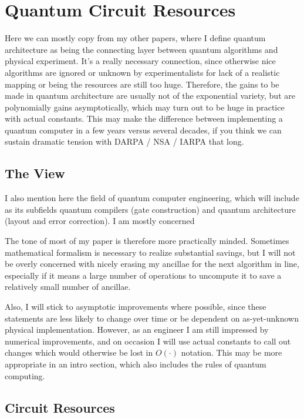 \section{Quantum Circuit Resources}

Here we can mostly copy from my other papers, where I define quantum
architecture as being the connecting layer between quantum algorithms
and physical experiment. It's a really necessary connection, since otherwise
nice algorithms are ignored or unknown by experimentalists for lack of a
realistic mapping or being the resources are still too huge. Therefore, the
gains to be made in quantum architecture are usually not of the exponential
variety, but are polynomially gains asymptotically, which may turn out to be
huge in practice with actual constants. This may make the difference between
implementing a quantum computer in a few years versus several decades, if you
think we can sustain dramatic tension with DARPA / NSA / IARPA that long.

\subsection{The View}

I also mention here the field of quantum computer engineering, which will
include as its subfields quantum compilers (gate construction) and quantum
architecture (layout and error correction). I am mostly concerned

The tone of most of my paper is therefore more practically minded. Sometimes
mathematical formalism is necessary to realize substantial savings, but I will
not be overly concerned with nicely erasing my ancillae for the next algorithm
in line, especially if it means a large number of operations to uncompute it
to save a relatively small number of ancillae.

Also, I will stick to asymptotic improvements where possible, since these
statements are less likely to change over time or be dependent on
as-yet-unknown physical implementation. However, as an engineer I am still
impressed by numerical improvements, and on occasion I will use actual
constants to call out changes which would otherwise be lost in $O(\cdot)$
notation. This may be more appropriate in an intro section, which also
includes the rules of quantum computing.

\subsection{Circuit Resources}

